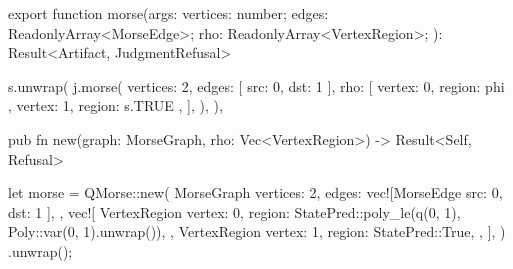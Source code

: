 \begin{tssrc}
export function morse(args: {
  vertices: number;
  edges: ReadonlyArray<MorseEdge>;
  rho: ReadonlyArray<VertexRegion>;
}): Result<Artifact, JudgmentRefusal>
\end{tssrc}
\begin{tssrc}
s.unwrap(
  j.morse({
    vertices: 2,
    edges: [{ src: 0, dst: 1 }],
    rho: [
      { vertex: 0, region: phi },
      { vertex: 1, region: s.TRUE },
    ],
  }),
),
\end{tssrc}
\begin{rustsrc}
pub fn new(graph: MorseGraph, rho: Vec<VertexRegion>) -> Result<Self, Refusal>
\end{rustsrc}
\begin{rustsrc}
let morse = QMorse::new(
    MorseGraph {
        vertices: 2,
        edges: vec![MorseEdge { src: 0, dst: 1 }],
    },
    vec![
        VertexRegion {
            vertex: 0,
            region: StatePred::poly_le(q(0, 1), Poly::var(0, 1).unwrap()),
        },
        VertexRegion {
            vertex: 1,
            region: StatePred::True,
        },
    ],
)
.unwrap();
\end{rustsrc}
